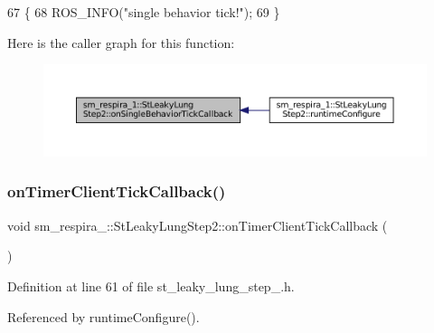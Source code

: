 \begin{DoxyCode}
67     \{
68         ROS\_INFO(\textcolor{stringliteral}{"single behavior tick!"});
69     \}
\end{DoxyCode}
Here is the caller graph for this function\+:
\nopagebreak
\begin{figure}[H]
\begin{center}
\leavevmode
\includegraphics[width=350pt]{structsm__respira__1_1_1StLeakyLungStep2_a0961f0efffd2c0140dd9cfdbcf9a7160_icgraph}
\end{center}
\end{figure}
\mbox{\label{structsm__respira__1_1_1StLeakyLungStep2_ae8f613e81c6e1a1a2ad39fbb27dc7bea}} 
\subsubsection{\texorpdfstring{on\+Timer\+Client\+Tick\+Callback()}{onTimerClientTickCallback()}}
{\footnotesize\ttfamily void sm\+\_\+respira\+\_\+::\+St\+Leaky\+Lung\+Step2\+::on\+Timer\+Client\+Tick\+Callback (\begin{DoxyParamCaption}{ }\end{DoxyParamCaption})\hspace{0.3cm}{\ttfamily [inline]}}



Definition at line 61 of file st\+\_\+leaky\+\_\+lung\+\_\+step\+\_.\+h.



Referenced by runtime\+Configure().


